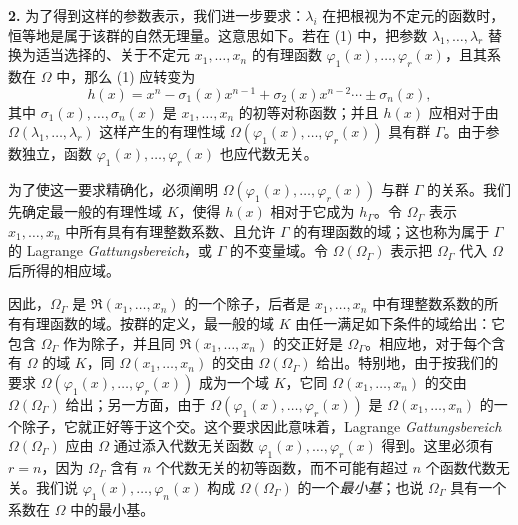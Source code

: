 \textbf{2.} 为了得到这样的参数表示，我们进一步要求：$\lambda_i$ 在把根视为不定元的函数时，恒等地是属于该群的自然无理量。这意思如下。若在 (1) 中，把参数 $\lambda_1,
\ldots,\lambda_r$ 替换为适当选择的、关于不定元 $x_1,
\ldots,x_n$ 的有理函数 $\varphi_1(x),\ldots,\varphi_r(x)$，且其系数在 $\Omega$ 中，那么 (1) 应转变为
\begin{equation}\tag{4}
h(x)=x^n-\sigma_1(x)x^{n-1}+\sigma_2(x)x^{n-2}\cdots \pm \sigma_n(x),
\end{equation}
其中 $\sigma_1(x),\ldots,\sigma_n(x)$ 是 $x_1,
\ldots,x_n$ 的初等对称函数；并且 $h(x)$ 应相对于由 $\Omega(\lambda_1,
\ldots,\lambda_r)$ 这样产生的有理性域 $\Omega(\varphi_1(x),\ldots,\varphi_r(x))$ 具有群 $\Gamma$。由于参数独立，函数 $\varphi_1(x),\ldots,\varphi_r(x)$ 也应代数无关。

为了使这一要求精确化，必须阐明 $\Omega(\varphi_1(x),\ldots,\varphi_r(x))$ 与群 $\Gamma$ 的关系。我们先确定最一般的有理性域 $K$，使得 $h(x)$ 相对于它成为 $h_\Gamma$。令 $\Omega_\Gamma$ 表示 $x_1,
\ldots,x_n$ 中所有具有有理整数系数、且允许 $\Gamma$ 的有理函数的域；这也称为属于 $\Gamma$ 的 Lagrange \emph{Gattungsbereich}，或 $\Gamma$ 的不变量域。令 $\Omega(\Omega_\Gamma)$ 表示把 $\Omega_\Gamma$ 代入 $\Omega$ 后所得的相应域。

因此，$\Omega_\Gamma$ 是 $\mathfrak R(x_1,
\ldots,x_n)$ 的一个除子，后者是 $x_1,
\ldots,x_n$ 中有理整数系数的所有有理函数的域。按群的定义，最一般的域 $K$ 由任一满足如下条件的域给出：它包含 $\Omega_\Gamma$ 作为除子，并且同 $\mathfrak R(x_1,
\ldots,x_n)$ 的交正好是 $\Omega_\Gamma$。相应地，对于每个含有 $\Omega$ 的域 $K$，同 $\Omega(x_1,
\ldots,x_n)$ 的交由 $\Omega(\Omega_\Gamma)$ 给出。特别地，由于按我们的要求 $\Omega(\varphi_1(x),\ldots,\varphi_r(x))$ 成为一个域 $K$，它同 $\Omega(x_1,
\ldots,x_n)$ 的交由 $\Omega(\Omega_\Gamma)$ 给出；另一方面，由于 $\Omega(\varphi_1(x),\ldots,\varphi_r(x))$ 是 $\Omega(x_1,
\ldots,x_n)$ 的一个除子，它就正好等于这个交。这个要求因此意味着，Lagrange \emph{Gattungsbereich} $\Omega(\Omega_\Gamma)$ 应由 $\Omega$ 通过添入代数无关函数 $\varphi_1(x),\ldots,\varphi_r(x)$ 得到。这里必须有 $r=n$，因为 $\Omega_\Gamma$ 含有 $n$ 个代数无关的初等函数，而不可能有超过 $n$ 个函数代数无关。我们说 $\varphi_1(x),\ldots,\varphi_n(x)$ 构成 $\Omega(\Omega_\Gamma)$ 的一个\emph{最小基}；也说 $\Omega_\Gamma$ 具有一个系数在 $\Omega$ 中的最小基。

